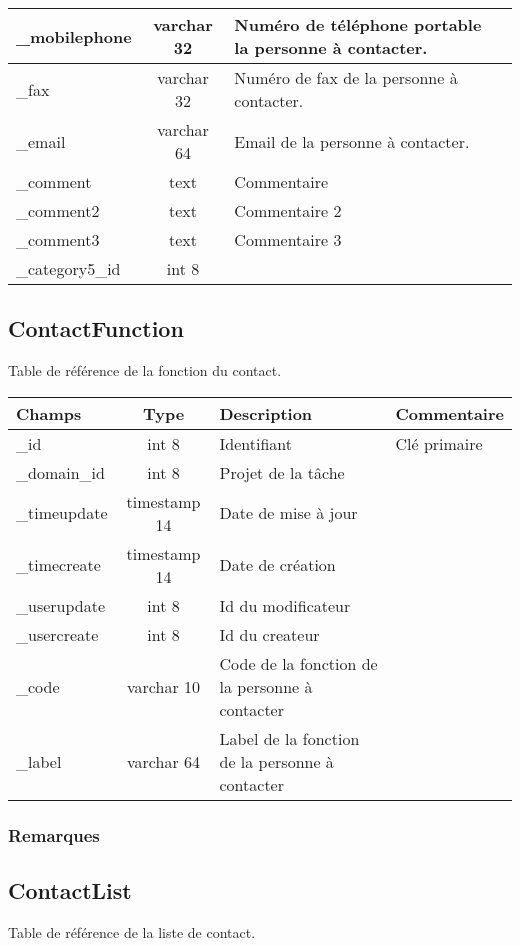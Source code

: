 \begin{tabular}{|p{3cm}|c|p{5.4cm}|p{2.6cm}|}
\hline
\_mobilephone & varchar 32 & Numéro de téléphone portable la personne à contacter. & \\
\hline
\_fax & varchar 32 & Numéro de fax de la personne à contacter. & \\
\hline
\_email & varchar 64  & Email de la personne à contacter. &\\
\hline
\_comment & text & Commentaire  &\\
\hline
\_comment2 & text & Commentaire 2  &\\
\hline
\_comment3 & text & Commentaire 3 &\\
\hline
\_category5\_id & int 8 &   &\\
\hline
\end{tabular}


\subsection{ContactFunction}
Table de référence de la fonction du contact.\\

\begin{tabular}{|p{3cm}|c|p{5.4cm}|p{2.6cm}|}
\hline
\textbf{Champs} & \textbf{Type} & \textbf{Description} & \textbf{Commentaire} \\
\hline
\_id & int 8 & Identifiant & Clé primaire \\
\hline
\_domain\_id & int 8 & Projet de la tâche & \\
\hline
\_timeupdate & timestamp 14 & Date de mise à jour & \\
\hline
\_timecreate & timestamp 14 & Date de création & \\
\hline
\_userupdate & int 8 & Id du modificateur & \\
\hline
\_usercreate & int 8 & Id du createur & \\
\hline
\_code & varchar 10 & Code de la fonction de la personne à contacter & \\
\hline
\_label & varchar 64 & Label de la fonction de la personne à contacter & \\
\hline
\end{tabular}

\subsubsection{Remarques}


\subsection{ContactList}
Table de référence de la liste de contact.

